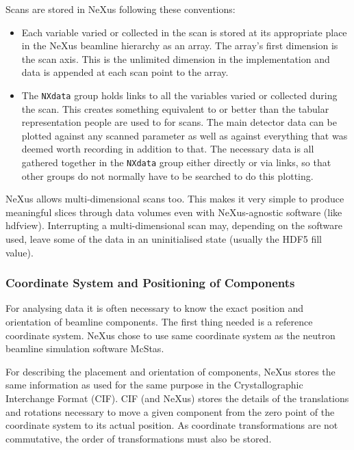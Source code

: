 \documentclass[%
 aip,
rsi,
 amsmath,amssymb,
 reprint,%
]{revtex4-1}
\begin{document}
Scans are stored in NeXus following these conventions: 
\begin{itemize}
\item Each variable varied or collected in the scan is stored at its appropriate place in the NeXus beamline 
 hierarchy as an array. The array's first dimension is the scan axis. This is the unlimited dimension in 
 the implementation and data is appended at each scan point to the array. 
\item The \texttt{NXdata} group holds links to all the variables varied or collected during the scan. 
 This creates something equivalent to or better than the tabular representation people are used to for scans. 
 The main detector data can be plotted against any scanned parameter as well as against everything that was 
 deemed worth recording in addition to that.  The necessary data is all gathered together in the \texttt{NXdata}
 group either directly or via links, so that other groups do not
 normally have to be searched to do this plotting.
 
\end{itemize}

NeXus allows multi-dimensional scans too. This makes it very simple to produce meaningful slices through data 
volumes even with NeXus-agnostic software (like hdfview). Interrupting a multi-dimensional scan may, depending 
on the software used, leave some of the data in an uninitialised state (usually the HDF5 fill value).

\subsubsection{Coordinate System and Positioning of Components}

For analysing data it is often necessary to know the exact position and orientation of beamline components. 
The first thing needed is a reference coordinate system. NeXus chose to use same coordinate system as the 
neutron beamline simulation software McStas\cite{mcstas}. 

For describing the placement and orientation of components, NeXus stores the same information as used for the 
same purpose in the Crystallographic Interchange Format (CIF)\cite{ITCVG}. CIF (and NeXus) stores the details 
of the translations and rotations necessary to move a given component from the zero point of the coordinate 
system to its actual position. As coordinate transformations are not commutative, the order of transformations 
must also be stored.
\end{document}
